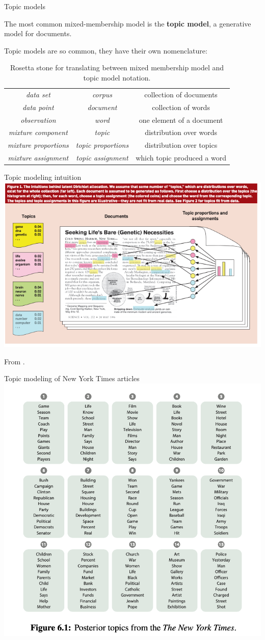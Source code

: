 \documentclass[aspectratio=169]{beamer}
\begin{document}
\begin{frame}{Topic models}

The most common mixed-membership model is the \textbf{topic model}, a generative model for documents.

Topic models are so common, they have their own nomenclature:

\begin{table}[]
    \centering
    \begin{tabular}{c|c|c}
        \textit{data set} & \textit{corpus} & collection of documents  \\
        \textit{data point} & \textit{document} & collection of words \\
        \textit{observation} & \textit{word} & one element of a document \\
        \textit{mixture component} & \textit{topic} & distribution over words \\
        \textit{mixture proportions} & \textit{topic proportions} & distribution over topics \\
        \textit{mixture assignment} & \textit{topic assignment} & which topic produced a word \\
    \end{tabular}
    \caption{Rosetta stone for translating between mixed membership model and topic model notation.}
    \label{tab:my_label}
\end{table}
\end{frame}

\begin{frame}{Topic modeling intuition}
\centering
\includegraphics[width=.65\textwidth]{figures/lap5/intuition.png}

From \citet{blei2012probabilistic}.
\end{frame}


\begin{frame}{Topic modeling of New York Times articles}
\centering
\includegraphics[width=.5\textwidth]{figures/lap5/nyt.png}

\end{frame}
\end{document}
